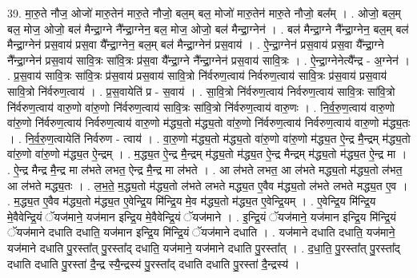 \documentclass[17pt]{extarticle}
\begin{document}
39. मा॒रु॒ते नौज॒ ओजो॑ मारु॒तेन॑ मारु॒ते नौजो॒ बल॒म् बल॒ मोजो॑ मारु॒तेन॑ मारु॒ते नौजो॒ बल᳚म् । . ओजो॒ बल॒म् बल॒ मोज॒ ओजो॒ बल॑ मैन्द्रा॒ग्ने नै᳚न्द्रा॒ग्नेन॒ बल॒ मोज॒ ओजो॒ बल॑ मैन्द्रा॒ग्नेन॑ । . बल॑ मैन्द्रा॒ग्ने नै᳚न्द्रा॒ग्नेन॒ बल॒म् बल॑ मैन्द्रा॒ग्नेन॑ प्रस॒वाय॑ प्रस॒वा यै᳚न्द्रा॒ग्नेन॒ बल॒म् बल॑ मैन्द्रा॒ग्नेन॑ प्रस॒वाय॑ । . ऐ॒न्द्रा॒ग्नेन॑ प्रस॒वाय॑ प्रस॒वा यै᳚न्द्रा॒ग्ने नै᳚न्द्रा॒ग्नेन॑ प्रस॒वाय॑ सावि॒त्रः सा॑वि॒त्रः प्र॑स॒वा
यै᳚न्द्रा॒ग्ने नै᳚न्द्रा॒ग्नेन॑ प्रस॒वाय॑ सावि॒त्रः । . ऐ॒न्द्रा॒ग्नेनेत्यै᳚न्द्र - अ॒ग्नेन॑ । . प्र॒स॒वाय॑ सावि॒त्रः सा॑वि॒त्रः प्र॑स॒वाय॑ प्रस॒वाय॑ सावि॒त्रो नि॑र्वरुण॒त्वाय॑ निर्वरुण॒त्वाय॑ सावि॒त्रः प्र॑स॒वाय॑ प्रस॒वाय॑ सावि॒त्रो नि॑र्वरुण॒त्वाय॑ । . प्र॒स॒वायेति॑ प्र - स॒वाय॑ । . सा॒वि॒त्रो नि॑र्वरुण॒त्वाय॑ निर्वरुण॒त्वाय॑ सावि॒त्रः सा॑वि॒त्रो नि॑र्वरुण॒त्वाय॑ वारु॒णो वा॑रु॒णो नि॑र्वरुण॒त्वाय॑ सावि॒त्रः सा॑वि॒त्रो नि॑र्वरुण॒त्वाय॑ वारु॒णः । . नि॒र्व॒रु॒ण॒त्वाय॑ वारु॒णो वा॑रु॒णो नि॑र्वरुण॒त्वाय॑ निर्वरुण॒त्वाय॑ वारु॒णो म॑द्ध्य॒तो म॑द्ध्य॒तो वा॑रु॒णो नि॑र्वरुण॒त्वाय॑ निर्वरुण॒त्वाय॑ वारु॒णो म॑द्ध्य॒तः । . नि॒र्व॒रु॒ण॒त्वायेति॑ निर्वरुण - त्वाय॑ । . वा॒रु॒णो म॑द्ध्य॒तो म॑द्ध्य॒तो वा॑रु॒णो वा॑रु॒णो म॑द्ध्य॒त ऐ॒न्द्र मै॒न्द्रम् म॑द्ध्य॒तो वा॑रु॒णो वा॑रु॒णो म॑द्ध्य॒त ऐ॒न्द्रम् । . म॒द्ध्य॒त ऐ॒न्द्र मै॒न्द्रम् म॑द्ध्य॒तो म॑द्ध्य॒त ऐ॒न्द्र मैन्द्रम् म॑द्ध्य॒तो म॑द्ध्य॒त ऐ॒न्द्र मा । . ऐ॒न्द्र मैन्द्र मै॒न्द्र मा ल॑भते लभत॒ ऐन्द्र मै॒न्द्र मा ल॑भते । . आ ल॑भते लभत॒ आ ल॑भते मद्ध्य॒तो म॑द्ध्य॒तो ल॑भत॒ आ ल॑भते मद्ध्य॒तः । . ल॒भ॒ते॒ म॒द्ध्य॒तो म॑द्ध्य॒तो ल॑भते लभते मद्ध्य॒त ए॒वैव म॑द्ध्य॒तो ल॑भते लभते मद्ध्य॒त ए॒व । . म॒द्ध्य॒त ए॒वैव म॑द्ध्य॒तो म॑द्ध्य॒त ए॒वेन्द्रि॒य मि॑न्द्रि॒य मे॒व म॑द्ध्य॒तो म॑द्ध्य॒त ए॒वेन्द्रि॒यम् । . ए॒वेन्द्रि॒य मि॑न्द्रि॒य मे॒वैवेन्द्रि॒यं ॅयज॑माने॒ यज॑मान इन्द्रि॒य मे॒वैवेन्द्रि॒यं ॅयज॑माने । . इ॒न्द्रि॒यं ॅयज॑माने॒ यज॑मान इन्द्रि॒य मि॑न्द्रि॒यं ॅयज॑माने दधाति दधाति॒ यज॑मान इन्द्रि॒य मि॑न्द्रि॒यं ॅयज॑माने दधाति । . यज॑माने दधाति दधाति॒ यज॑माने॒ यज॑माने दधाति पु॒रस्ता᳚त् पु॒रस्ता᳚द् दधाति॒ यज॑माने॒ यज॑माने दधाति पु॒रस्ता᳚त् । . द॒धा॒ति॒ पु॒रस्ता᳚त् पु॒रस्ता᳚द् दधाति दधाति पु॒रस्ता॑ दै॒न्द्र स्यै॒न्द्रस्य॑ पु॒रस्ता᳚द् दधाति दधाति पु॒रस्ता॑ दै॒न्द्रस्य॑ । \newline
\pagebreak
{}
\end{document}
